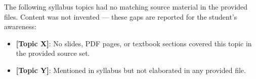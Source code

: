 The following syllabus topics had no matching source material in the provided files.
Content was not invented --- these gaps are reported for the student's awareness:

\begin{itemize}
    \item \textbf{[Topic X]}: No slides, PDF pages, or textbook sections covered this topic
          in the provided source set.
    \item \textbf{[Topic Y]}: Mentioned in syllabus but not elaborated in any provided file.
\end{itemize}

